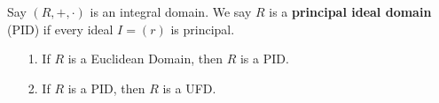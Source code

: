 \begin{prf}
\begin{description}
    \end{description}
\end{prf}

\begin{definition}
    Say $(R, +, \cdot)$ is an integral domain. We say $R$ is a
    \textbf{principal ideal domain} (PID) if every ideal $I = (r)$
    is principal.
\end{definition}

\begin{proposition}
    \begin{itemize}
        \item[1.] If $R$ is a Euclidean Domain, then $R$ is a PID.
        \item[2.] If $R$ is a PID, then $R$ is a UFD. 
    \end{itemize}
\end{proposition}


